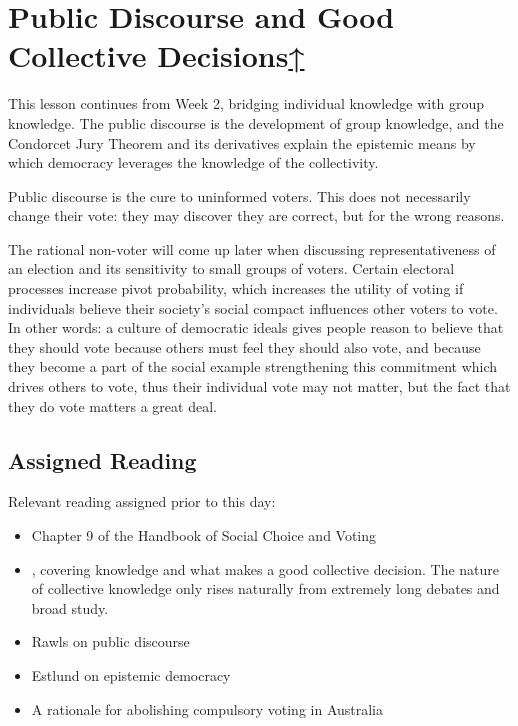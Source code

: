 
\label{cur:public-discourse}
\section{Public Discourse and Good Collective Decisions\hyperref[syllabus]{↑}}

This lesson continues from Week 2, bridging individual knowledge with group knowledge.  The public discourse is the development of group knowledge, and the Condorcet Jury Theorem and its derivatives explain the epistemic means by which democracy leverages the knowledge of the collectivity.

Public discourse is the cure to uninformed voters.  This does not necessarily change their vote:  they may discover they are correct, but for the wrong reasons.

The rational non-voter will come up later when discussing representativeness of an election and its sensitivity to small groups of voters.  Certain electoral processes increase pivot probability, which increases the utility of voting if individuals believe their society's social compact influences other voters to vote.  In other words:  a culture of democratic ideals gives people reason to believe that they should vote because others must feel they should also vote, and because they become a part of the social example strengthening this commitment which drives others to vote, thus their individual vote may not matter, but the fact that they do vote matters a great deal.


\subsection{Assigned Reading}

Relevant reading assigned prior to this day:

\begin{itemize}
    \item Chapter 9 of the Handbook of Social Choice and Voting \autocite[140-158]{Heckelman2015}

    \item {}, covering knowledge and what makes a good collective decision.  The nature of collective knowledge only rises naturally from extremely long debates and broad study.

    \item Rawls on public discourse \autocite{Rawls1997}

    \item Estlund on epistemic democracy \autocite{Estlund2008}

    \item A rationale for abolishing compulsory voting in Australia \autocite{Swenson2007}

\end{itemize}

